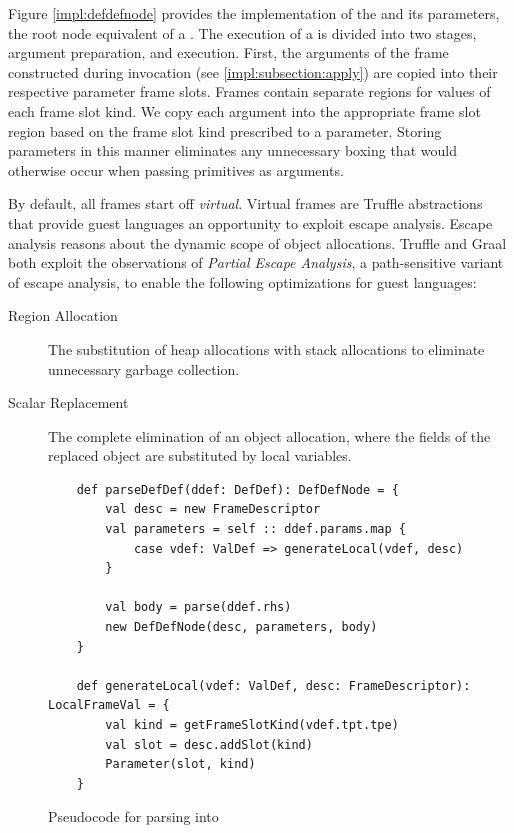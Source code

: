 Figure \ref{impl:defdefnode} provides the implementation of the  and its parameters, the root node equivalent of a .
The execution of a  is divided into two stages, argument preparation, and execution.
First, the arguments of the frame constructed during invocation (see \ref{impl:subsection:apply}) are copied into their respective parameter frame slots.
Frames contain separate regions for values of each frame slot kind.
We copy each argument into the appropriate frame slot region based on the frame slot kind prescribed to a parameter.
Storing parameters in this manner eliminates any unnecessary boxing that would otherwise occur when passing primitives as arguments.

By default, all frames start off \textit{virtual}.
Virtual frames are Truffle abstractions that provide guest languages an opportunity to exploit escape analysis.
Escape analysis\cite{escape-analysis} reasons about the dynamic scope of object allocations. 
Truffle and Graal both exploit the observations of \textit{Partial Escape Analysis}\cite{java:partial-escape-analysis}, a path-sensitive variant of escape analysis, to enable the following optimizations for guest languages:

\begin{description}
	\item[Region Allocation\cite{java:escape-analysis,tofte:region-memory}] The substitution of heap allocations with stack allocations to eliminate unnecessary garbage collection.
	\item[Scalar Replacement\cite{java:escape-analysis-optimizations}] The complete elimination of an object allocation, where the fields of the replaced object are substituted by local variables.
\end{description}

\begin{figure}[!htb]
	\begin{verbatim}
	def parseDefDef(ddef: DefDef): DefDefNode = {
		val desc = new FrameDescriptor
		val parameters = self :: ddef.params.map {
			case vdef: ValDef => generateLocal(vdef, desc)
		}
			
		val body = parse(ddef.rhs)
		new DefDefNode(desc, parameters, body)
	}
		
	def generateLocal(vdef: ValDef, desc: FrameDescriptor): LocalFrameVal = {
		val kind = getFrameSlotKind(vdef.tpt.tpe)
		val slot = desc.addSlot(kind)
		Parameter(slot, kind)
	}
	\end{verbatim}
	\caption{Pseudocode for parsing  into }
	\label{impl:parse-defdef}
\end{figure}

